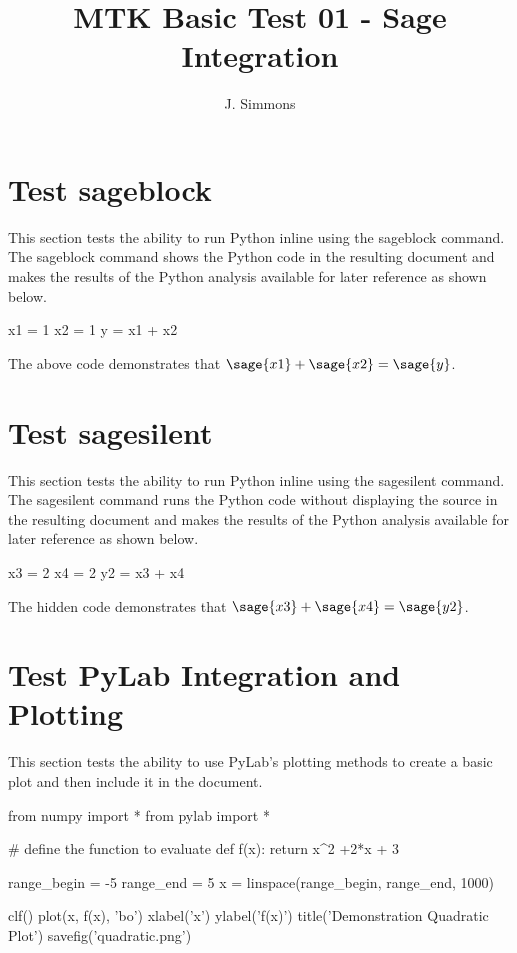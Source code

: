 \documentclass{article}
\title{MTK Basic Test 01 - Sage Integration}
\author{J. Simmons}
\begin{document}
\maketitle

\section{Test sageblock}
This section tests the ability to run Python inline using the sageblock command.  The sageblock command shows the Python code in the resulting document and makes the results of the Python analysis available for later reference as shown below.

\begin{sageblock}
  x1 = 1
  x2 = 1
  y = x1 + x2
\end{sageblock}

The above code demonstrates that $\sage{x1} + \sage{x2}  = \sage{y} $.


\section{Test sagesilent}
This section tests the ability to run Python inline using the sagesilent command.  The sagesilent command runs the Python code without displaying the source in the resulting document and makes the results of the Python analysis available for later reference as shown below.

\begin{sagesilent}
  x3 = 2
  x4 = 2
  y2 = x3 + x4
\end{sagesilent}

The hidden code demonstrates that $\sage{x3} + \sage{x4}  = \sage{y2}$.

\section{Test PyLab Integration and Plotting}
This section tests the ability to use PyLab's plotting methods to create a basic plot and then include it in the document.

\begin{sageblock}
  from numpy import *
  from pylab import *
  
  # define the function to evaluate
  def f(x):
    return x^2 +2*x + 3
  
  range_begin = -5
  range_end = 5 
  x = linspace(range_begin, range_end, 1000)
  
  clf()    
  plot(x, f(x), 'bo')
  xlabel('x')
  ylabel('f(x)')
  title('Demonstration Quadratic Plot')
  savefig('quadratic.png')
\end{sageblock}
\end{document}
